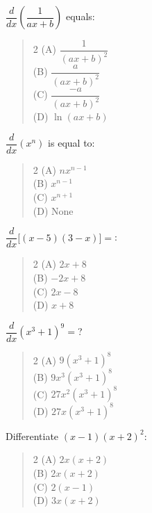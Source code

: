 \documentclass[11pt,a4paper]{article}
\begin{document}
\begin{mcqlist}
\item $\dfrac{d}{dx}\left(\dfrac{1}{ax+b}\right)$ equals:
\begin{quote}\begin{multicols}{2}
\noindent (A) $\dfrac{1}{(ax+b)^2}$ \\
(B) $\dfrac{a}{(ax+b)^2}$ \\
(C) $\dfrac{-a}{(ax+b)^2}$ \\
(D) $\ln(ax+b)$
\end{multicols}\end{quote}

\item $\dfrac{d}{dx}(x^n)$ is equal to:
\begin{quote}\begin{multicols}{2}
\noindent (A) $nx^{n-1}$ \\
(B) $x^{n-1}$ \\
(C) $x^{n+1}$ \\
(D) None
\end{multicols}\end{quote}

\item $\dfrac{d}{dx}\big[(x-5)(3-x)\big] = $:
\begin{quote}\begin{multicols}{2}
\noindent (A) $2x+8$ \\
(B) $-2x+8$ \\
(C) $2x-8$ \\
(D) $x+8$
\end{multicols}\end{quote}

\item $\dfrac{d}{dx}(x^3+1)^9 = $?
\begin{quote}\begin{multicols}{2}
\noindent (A) $9(x^3+1)^8$ \\
(B) $9x^3(x^3+1)^8$ \\
(C) $27x^2(x^3+1)^8$ \\
(D) $27x(x^3+1)^8$
\end{multicols}\end{quote}

\item Differentiate $(x-1)(x+2)^2$:
\begin{quote}\begin{multicols}{2}
\noindent (A) $2x(x+2)$ \\
(B) $2x(x+2)$ \\
(C) $2(x-1)$ \\
(D) $3x(x+2)$
\end{multicols}\end{quote}


\end{mcqlist}
\end{document}
